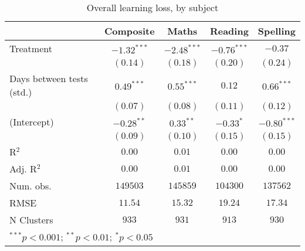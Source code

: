 
\begin{table}
\begin{center}
\begin{tabular}{l c c c c}
\hline
 & Composite & Maths & Reading & Spelling \\
\hline
Treatment                 & $-1.32^{***}$ & $-2.48^{***}$ & $-0.76^{***}$ & $-0.37$       \\
                          & $(0.14)$      & $(0.18)$      & $(0.20)$      & $(0.24)$      \\
Days between tests (std.) & $0.49^{***}$  & $0.55^{***}$  & $0.12$        & $0.66^{***}$  \\
                          & $(0.07)$      & $(0.08)$      & $(0.11)$      & $(0.12)$      \\
(Intercept)               & $-0.28^{**}$  & $0.33^{**}$   & $-0.33^{*}$   & $-0.80^{***}$ \\
                          & $(0.09)$      & $(0.10)$      & $(0.15)$      & $(0.15)$      \\
\hline
R$^2$                     & $0.00$        & $0.01$        & $0.00$        & $0.00$        \\
Adj. R$^2$                & $0.00$        & $0.01$        & $0.00$        & $0.00$        \\
Num. obs.                 & $149503$      & $145859$      & $104300$      & $137562$      \\
RMSE                      & $11.54$       & $15.32$       & $19.24$       & $17.34$       \\
N Clusters                & $933$         & $931$         & $913$         & $930$         \\
\hline
\multicolumn{5}{l}{\scriptsize{$^{***}p<0.001$; $^{**}p<0.01$; $^{*}p<0.05$}}
\end{tabular}
\caption{Overall learning loss, by subject}
\label{table:overall}
\end{center}
\end{table}
